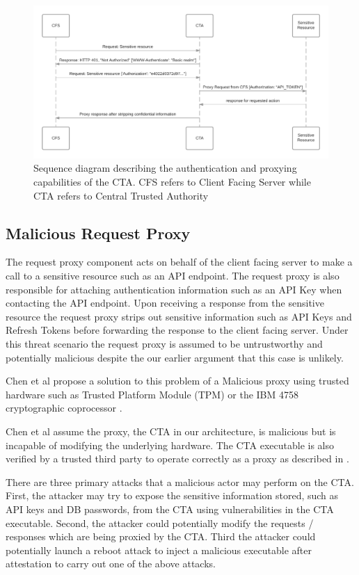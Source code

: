 \documentclass[a4paper,twoside]{article}
\begin{document}
\begin{figure}[!ht]
  \centering
  \includegraphics[keepaspectratio=true,scale=0.175]{sequence_diagram}
  \caption{Sequence diagram describing the authentication and proxying capabilities of the CTA. CFS refers to Client Facing Server while CTA refers to Central Trusted Authority}
  \label{fig:ctaarchitecture}
\end{figure}
\subsection{Malicious Request Proxy}

The request proxy component acts on behalf of the client facing server to make a call to a sensitive resource such as an API endpoint. The request proxy is also responsible for attaching authentication information such as an API Key when contacting the API endpoint. Upon receiving a response from the sensitive resource the request proxy strips out sensitive information such as API Keys and Refresh Tokens before forwarding the response to the client facing server.  Under this threat scenario the request proxy is assumed to be untrustworthy and potentially malicious despite the our earlier argument that this case is unlikely.

Chen et al \cite{chen_towards_2012} propose a solution to this problem of a Malicious proxy using trusted hardware such as Trusted Platform Module (TPM) or the IBM 4758 cryptographic coprocessor \cite{parno_bootstrapping_2010}. 

Chen et al assume the proxy, the CTA in our architecture, is malicious but is incapable of modifying the underlying hardware. The CTA executable is also verified by a trusted third party to operate correctly as a proxy as described in \cite{parno_bootstrapping_2010}.

There are three primary attacks that a malicious actor may perform on the CTA. First, the attacker may try to expose the sensitive information stored, such as API keys and DB passwords, from the CTA using vulnerabilities in the CTA executable. Second, the attacker could potentially modify the requests / responses which are being proxied by the CTA. Third the attacker could potentially launch a reboot attack to inject a malicious executable after attestation to carry out one of the above attacks.
\end{document}
